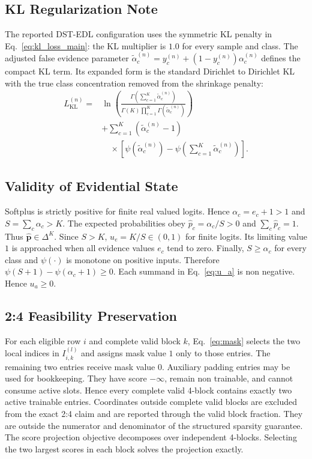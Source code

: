 \documentclass[letterpaper]{article}
\begin{document}
\subsection{KL Regularization Note}
The reported DST-EDL configuration uses the symmetric KL penalty in Eq.~\ref{eq:kl_loss_main}: the KL multiplier is $1.0$ for every sample and class. The adjusted false evidence parameter $\tilde{\alpha}_c^{(n)}=y_c^{(n)}+(1-y_c^{(n)})\alpha_c^{(n)}$ defines the compact KL term. Its expanded form is the standard Dirichlet to Dirichlet KL with the true class concentration removed from the shrinkage penalty:
\begin{equation}\label{eq:kl_loss_expanded}
\begin{aligned}
    L_{\mathrm{KL}}^{(n)}
    ={}&\ln\!\left(
    \frac{\Gamma(\sum_{c=1}^{K}\tilde\alpha_c^{(n)})}
    {\Gamma(K)\prod_{c=1}^{K}\Gamma(\tilde\alpha_c^{(n)})}\right)\\
    &+\sum_{c=1}^{K}(\tilde\alpha_c^{(n)}-1)\\
    &\quad\times\left[
    \psi(\tilde\alpha_c^{(n)})
    -\psi(\sum_{c=1}^{K}\tilde\alpha_c^{(n)})\right].
\end{aligned}
\end{equation}

\subsection{Validity of Evidential State}
Softplus is strictly positive for finite real valued logits. Hence $\alpha_c=e_c+1>1$ and $S=\sum_c\alpha_c>K$. The expected probabilities obey $\hat{p}_c=\alpha_c/S>0$ and $\sum_c\hat{p}_c=1$. Thus $\hat{\bm{p}}\in\Delta^K$. Since $S>K$, $u_e=K/S\in(0,1)$ for finite logits. Its limiting value $1$ is approached when all evidence values $e_c$ tend to zero. Finally, $S\ge\alpha_c$ for every class and $\psi(\cdot)$ is monotone on positive inputs. Therefore $\psi(S+1)-\psi(\alpha_c+1)\ge0$. Each summand in Eq.~\ref{eq:u_a} is non negative. Hence $u_a\ge0$.

\subsection{2:4 Feasibility Preservation}
\label{app:24_feasibility}
For each eligible row $i$ and complete valid block $k$, Eq.~\ref{eq:mask} selects the two local indices in $I_{i,k}^{(l)}$ and assigns mask value $1$ only to those entries. The remaining two entries receive mask value $0$. Auxiliary padding entries may be used for bookkeeping. They have score $-\infty$, remain non trainable, and cannot consume active slots. Hence every complete valid 4-block contains exactly two active trainable entries. Coordinates outside complete valid blocks are excluded from the exact 2:4 claim and are reported through the valid block fraction. They are outside the numerator and denominator of the structured sparsity guarantee. The score projection objective decomposes over independent 4-blocks. Selecting the two largest scores in each block solves the projection exactly.
\end{document}
